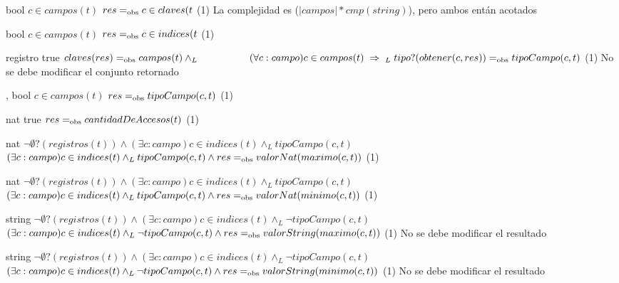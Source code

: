 {   
    }
{bool}
{$c \in campos(t)$}
{$res =_{\mathrm{obs}} c \in claves(t$}
{\bigo(1)}
{}
{La complejidad es \bigo($|campos| * cmp(string)$), pero ambos entán acotados}

{   
    }
{bool}
{$c \in campos(t)$}
{$res =_{\mathrm{obs}} c \in indices(t$}
{\bigo(1)}
{}
{}

{   }
{registro}
{true}
{$claves(res) \igobs campos(t) \land_L \\
    \hspace*{5em} (\forall c : campo) c \in campos(t) \implies_L \; tipo?(obtener(c,res)) \igobs tipoCampo(c,t)$}
{\bigo(1)}
{No se debe modificar el conjunto retornado}
{}

{   ,
    }
{bool}
{$c \in campos(t)$}
{$res =_{\mathrm{obs}} tipoCampo(c,t)$}
{\bigo(1)}
{}
{}

{   }
{nat}
{true}
{$res =_{\mathrm{obs}} cantidadDeAccesos(t)$}
{\bigo(1)}
{}
{}

{   }
{nat}
{$\neg\emptyset?(registros(t)) \land
    (\exists c : campo) c \in indices(t) \land_L tipoCampo(c,t)$}
{$(\exists c : campo) c \in indices(t) \land_L tipoCampo(c,t) \land
    res =_{\mathrm{obs}} valorNat(maximo(c,t))$}
{\bigo(1)}
{}
{}

{   }
{nat}
{$\neg\emptyset?(registros(t)) \land
    (\exists c : campo) c \in indices(t) \land_L tipoCampo(c,t)$}
{$(\exists c : campo) c \in indices(t) \land_L tipoCampo(c,t) \land
    res =_{\mathrm{obs}} valorNat(minimo(c,t))$}
{\bigo(1)}
{}
{}

{   }
{string}
{$\neg\emptyset?(registros(t)) \land
    (\exists c : campo) c \in indices(t) \land_L \neg tipoCampo(c,t)$}
{$(\exists c : campo) c \in indices(t) \land_L \neg tipoCampo(c,t) \land
    res =_{\mathrm{obs}} valorString(maximo(c,t))$}
{\bigo(1)}
{No se debe modificar el resultado}
{}

{   }
{string}
{$\neg\emptyset?(registros(t)) \land
    (\exists c : campo) c \in indices(t) \land_L \neg tipoCampo(c,t)$}
{$(\exists c : campo) c \in indices(t) \land_L \neg tipoCampo(c,t) \land
    res =_{\mathrm{obs}} valorString(minimo(c,t))$}
{\bigo(1)}
{No se debe modificar el resultado}
{}

